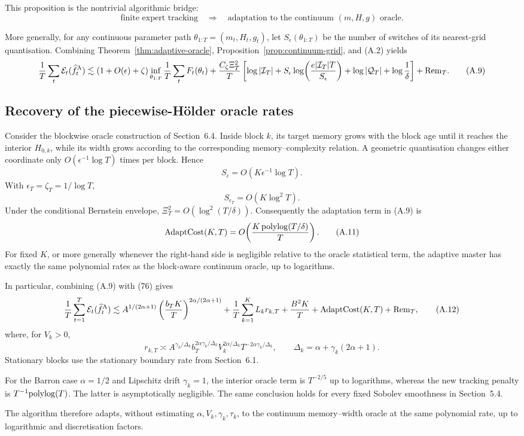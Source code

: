 This proposition is the nontrivial algorithmic bridge:
\[
 \text{finite expert tracking}
 \quad\Longrightarrow\quad
 \text{adaptation to the continuum }(m,H,g)\text{ oracle}.
\]

More generally, for any continuous parameter path
\(\theta_{1:T}=(m_t,H_t,g_t)\), let
\(S_\epsilon(\theta_{1:T})\) be the number of switches of its nearest-grid
quantisation.  Combining Theorem~\ref{thm:adaptive-oracle},
Proposition~\ref{prop:continuum-grid}, and (A.2) yields
\[
 \frac1T\sum_t\mathcal E_t(\widehat f_t^{\rm A})
 \lesssim
 (1+O(\epsilon)+\zeta)
 \inf_{\theta_{1:T}}
 \frac1T\sum_tF_t(\theta_t)
 +
 \frac{C_\zeta\Xi_T^2}{T}
 \left[
 \log|\mathcal I_T|
 +S_\epsilon
 \log\!\left(\frac{e|\mathcal I_T|T}{S_\epsilon}\right)
 +\log|\mathcal Q_T|
 +\log\frac1\delta
 \right]
 +{\rm Rem}_T.
 \tag{A.9}
\]

\subsection{Recovery of the piecewise-Hölder oracle rates}

Consider the blockwise oracle construction of Section~6.4.  Inside block \(k\),
its target memory grows with the block age until it reaches the interior
\(H_{0,k}\), while its width grows according to the corresponding
memory--complexity relation.  A geometric quantisation changes either coordinate
only \(O(\epsilon^{-1}\log T)\) times per block.  Hence
\[
 S_\epsilon
 =
 O(K\epsilon^{-1}\log T).
 \tag{A.10}
\]
With \(\epsilon_T=\zeta_T=1/\log T\),
\[
 S_{\epsilon_T}=O(K\log^2T).
\]
Under the conditional Bernstein envelope,
\(\Xi_T^2=O(\log^2(T/\delta))\).  Consequently the adaptation term in
(A.9) is
\[
 {\rm AdaptCost}(K,T)
 =
 O\!\left(\frac{K\,{\rm polylog}(T/\delta)}{T}\right).
 \tag{A.11}
\]
For fixed \(K\), or more generally whenever the right-hand side is negligible
relative to the oracle statistical term, the adaptive master has exactly the
same polynomial rates as the block-aware continuum oracle, up to logarithms.

In particular, combining (A.9) with (76) gives
\[
 \frac1T\sum_{t=1}^T
 \mathcal E_t(\widehat f_t^{\rm A})
 \lesssim
 A^{1/(2\alpha+1)}
 \left(\frac{b_TK}{T}\right)^{2\alpha/(2\alpha+1)}
 +
 \frac1T\sum_{k=1}^KL_kr_{k,T}
 +
 \frac{B^2K}{T}
 +
 {\rm AdaptCost}(K,T)
 +
 {\rm Rem}_T,
 \tag{A.12}
\]
where, for \(V_k>0\),
\[
 r_{k,T}
 \asymp
 A^{\gamma_k/\Delta_k}
 b_T^{2\alpha\gamma_k/\Delta_k}
 V_k^{2\alpha/\Delta_k}
 T^{-2\alpha\gamma_k/\Delta_k},
 \qquad
 \Delta_k=\alpha+\gamma_k(2\alpha+1).
\]
Stationary blocks use the stationary boundary rate from Section~6.1.

For the Barron case \(\alpha=1/2\) and Lipschitz drift \(\gamma_k=1\), the
interior oracle term is \(T^{-2/5}\) up to logarithms, whereas the new tracking
penalty is \(T^{-1}{\rm polylog}(T)\).  The latter is asymptotically negligible.
The same conclusion holds for every fixed Sobolev smoothness in Section~5.4.

The algorithm therefore adapts, without estimating
\(\alpha,V_k,\gamma_k,\tau_k\), to the continuum memory--width oracle at the
same polynomial rate, up to logarithmic and discretisation factors.
